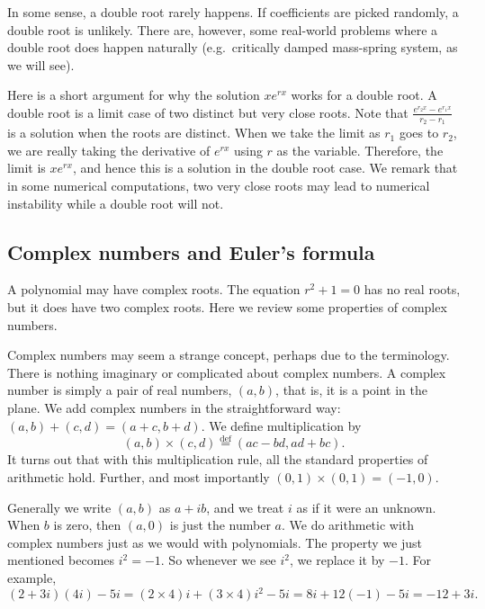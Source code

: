 In some sense, a double root rarely happens.  If coefficients are 
picked randomly, a double root is unlikely.
There are, however, some real-world problems
where a double root does happen naturally (e.g.\ critically damped
mass-spring system, as we will see).

Here is a short argument for why the solution $x e^{r x}$ works for a
double root.
A double root is a limit case of
two distinct but very close roots.  Note that 
$\frac{e^{r_2 x} - e^{r_1 x}}{r_2 - r_1}$ is a solution when the roots are
distinct.  When we take the limit as $r_1$ goes to $r_2$, we are really
taking the
derivative of $e^{rx}$ using $r$ as the variable.  Therefore, the limit is 
$x e^{rx}$, and hence this is a solution in the double root case.
We remark that in some numerical computations,
two very close roots may lead to numerical instability while
a double root will not.

\subsection{Complex numbers and Euler's formula}

A polynomial may have complex roots.  The
equation $r^2 + 1 = 0$ has no real roots, but it does have two complex roots.
Here we review some properties of complex numbers.

Complex numbers may seem a strange concept, perhaps due to the
terminology.  There is nothing imaginary or complicated about complex
numbers.
A complex number is simply a pair of real numbers, $(a,b)$,  
that is,
it is a point in the plane.  We add complex numbers
in the straightforward way: $(a,b)+(c,d)=(a+c,b+d)$.  We define
multiplication by
\begin{equation*}
(a,b) \times (c,d) \overset{\text{def}}{=} (ac-bd,ad+bc) .
\end{equation*}
It turns out that with this multiplication rule, all the standard properties
of arithmetic hold.  Further, and most importantly $(0,1) \times (0,1) =
(-1,0)$.

Generally we write $(a,b)$ as $a+ib$, and we treat $i$ as if it were an
unknown.  When $b$ is zero, then $(a,0)$ is just the number $a$.
We do arithmetic with complex numbers just as we would
with polynomials.
The property we just mentioned becomes $i^2 = -1$.
So whenever we see $i^2$, we replace it by $-1$.
For example,
\begin{equation*}
(2+3i)(4i) - 5i = 
(2\times 4)i + (3 \times 4) i^2 - 5i
=
8i + 12 (-1) - 5i
=
-12 + 3i .
\end{equation*}

